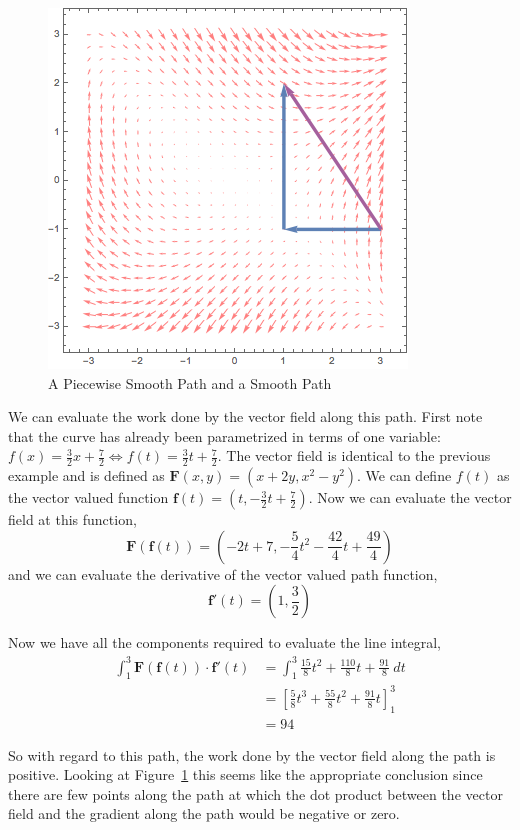 \documentclass[12pt]{article}
\begin{document}
\begin{figure}[h!]
\centering
\caption{A Piecewise Smooth Path and a Smooth Path}
\label{fig:lineintegralexample2}
\indent\includegraphics[scale=0.6]{line_integral_example2.png}
\end{figure}

 We can evaluate the work done by the vector field along this path. First note that the curve has already been parametrized in terms of one variable: $f(x) = \frac{3}{2}x + \frac{7}{2} \Leftrightarrow f(t) = \frac{3}{2}t + \frac{7}{2}$. The vector field is identical to the previous example and is defined as $\mathbf{F}(x,y) = (x+2y, x^2-y^2)$. We can define $f(t)$ as the vector valued function $\mathbf{f}(t) = (t,-\frac{3}{2}t+\frac{7}{2})$. Now we can evaluate the vector field at this function, \\
\[
\mathbf{F}(\mathbf{f}(t)) = \left( -2t + 7, -\frac{5}{4}t^2 - \frac{42}{4}t + \frac{49}{4} \right)
\]
and we can evaluate the derivative of the vector valued path function,
\[
\mathbf{f}'(t) = \left( 1, \frac{3}{2} \right)
\]

 Now we have all the components required to evaluate the line integral,
\begin{align*}
\int_1^3 \mathbf{F}(\mathbf{f}(t))\cdot\mathbf{f}'(t) &= \int_1^3  \frac{15}{8}t^2 + \frac{110}{8}t + \frac{91}{8} \ dt\\
&= \left[ \frac{5}{8}t^3 + \frac{55}{8}t^2 + \frac{91}{8}t \right]_1^3 \\
&= 94
\end{align*}

 So with regard to this path, the work done by the vector field along the path is positive.  Looking at Figure~\ref{fig:lineintegralexample2} this seems like the appropriate conclusion since there are few points along the path at which the dot product between the vector field and the gradient along the path would be negative or zero.\\
\end{document}
